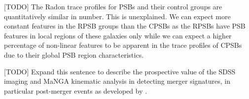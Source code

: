 [TODO] The Radon trace profiles for PSBs and their control groups are quantitatively similar in number. This is unexplained. We can expect more constant features in the RPSB groups than the CPSBs as the RPSBs have PSB features in local regions of these galaxies only while we can expect a higher percentage of non-linear features to be apparent in the trace profiles of CPSBs due to their global PSB region characteristics. 

[TODO] Expand this sentence to describe the prospective value of the SDSS imaging and MaNGA kinematic analysis in detecting merger signatures, in particular post-merger events as developed by \cite{2019DDA....5020304N}.